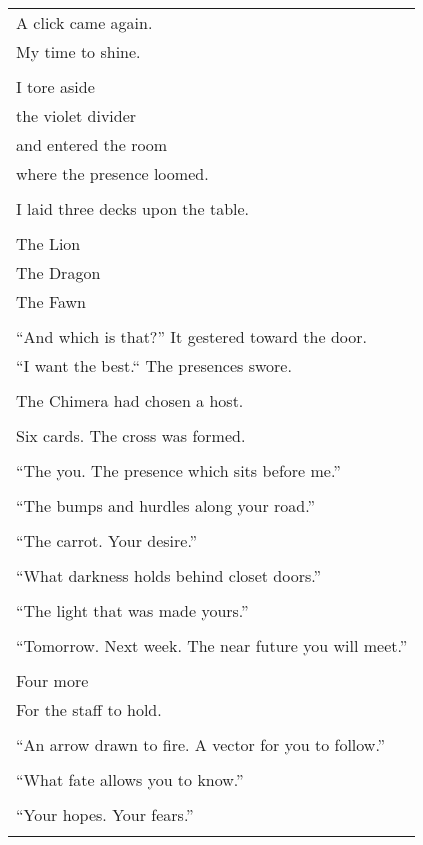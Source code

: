 \documentclass{article}
\begin{document}
\begin{center}
\begin{tabular}{l}
\\
A click came again. \\
My time to shine. \\
\\
I tore aside \\
the violet divider \\
and entered the room \\
where the presence loomed. \\
\\
I laid three decks upon the table. \\
\\
The Lion \\
The Dragon \\
The Fawn \\
\\
``And which is that?'' It gestered toward the door. \\
``I want the best.`` The presences swore. \\
\\
The Chimera had chosen a host. \\
\\
Six cards.
The cross was formed. \\
\\
``The you.  The presence which sits before me.'' \\
\\
``The bumps and hurdles along your road.'' \\
\\
``The carrot.  Your desire.'' \\
\\
``What darkness holds behind closet doors.'' \\
\\
``The light that was made yours.'' \\
\\
``Tomorrow.  Next week.  The near future you will meet.'' \\
\\
Four more \\
For the staff to hold. \\
\\
``An arrow drawn to fire.  A vector for you to follow.'' \\
\\
``What fate allows you to know.'' \\
\\
``Your hopes.  Your fears.'' \\
\\

\end{tabular}
\end{center}
\end{document}
